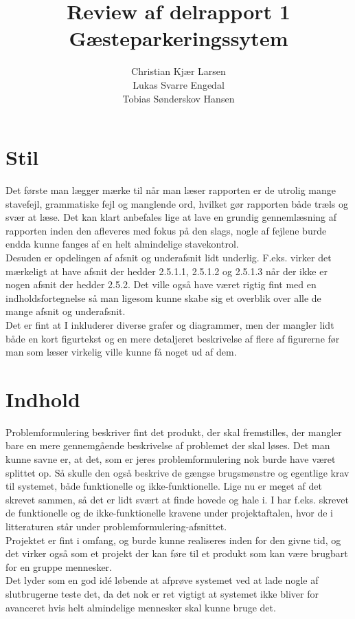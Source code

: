 \documentclass[12pt]{article}
\begin{document}
\title{
  \Huge{Review af delrapport 1} \\
  \Large{Gæsteparkeringssytem}
}
\author{
  Christian Kjær Larsen \\
  Lukas Svarre Engedal \\
  Tobias Sønderskov Hansen \\
}
\maketitle

\section{Stil}
Det første man lægger mærke til når man læser rapporten er de utrolig mange stavefejl, grammatiske fejl og manglende ord, hvilket gør rapporten både træls og svær at læse. 
Det kan klart anbefales lige at lave en grundig gennemlæsning af rapporten inden den afleveres med fokus på den slags, nogle af fejlene burde endda kunne fanges af en helt almindelige stavekontrol. \\
Desuden er opdelingen af afsnit og underafsnit lidt underlig. F.eks. virker det mærkeligt at have afsnit der hedder 2.5.1.1, 2.5.1.2 og 2.5.1.3 når der ikke er nogen afsnit der hedder 2.5.2. 
Det ville også have været rigtig fint med en indholdsfortegnelse så man ligesom kunne skabe sig et overblik over alle de mange afsnit og underafsnit. \\
Det er fint at I inkluderer diverse grafer og diagrammer, men der mangler lidt både en kort figurtekst og en mere detaljeret beskrivelse af flere af figurerne før man som læser virkelig ville kunne få noget ud af dem. \\

\section{Indhold}
Problemformulering beskriver fint det produkt, der skal fremstilles, der mangler bare en mere gennemgående beskrivelse af problemet der skal løses. 
Det man kunne savne er, at det, som er jeres problemformulering nok burde have været splittet op. Så skulle den også beskrive de gængse brugsmønstre og egentlige krav til systemet, både funktionelle og ikke-funktionelle. Lige nu er meget af det skrevet sammen, så det er lidt svært at finde hovede og hale i. 
I har f.eks. skrevet de funktionelle og de ikke-funktionelle kravene under projektaftalen, hvor de i litteraturen står under problemformulering-afsnittet. \\
Projektet er fint i omfang, og burde kunne realiseres inden for den givne tid, og det virker også som et projekt der kan føre til et produkt som kan være brugbart for en gruppe mennesker. \\
Det lyder som en god idé løbende at afprøve systemet ved at lade nogle af slutbrugerne teste det, da det nok er ret vigtigt at systemet ikke bliver for avanceret hvis helt almindelige mennesker skal kunne bruge det. \\
\end{document}
